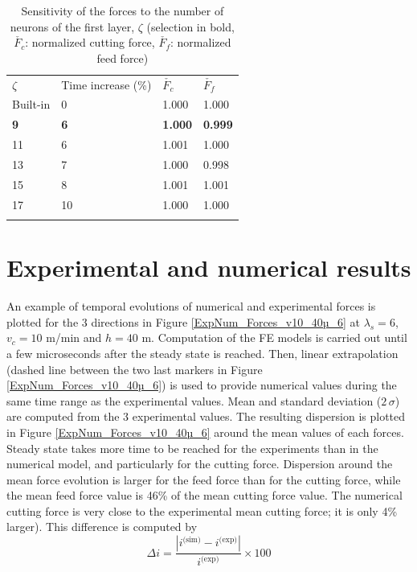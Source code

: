 \documentclass[preprint,12pt,times]{elsarticle}
\begin{document}
%
\begin{table}[!h]
\begin{center}
\caption{\label{tab:NbNeurons} Sensitivity of the forces to the number of neurons of the first layer, $\zeta$
(selection in bold, $\check{F_c}$: normalized cutting force, $\check{F_f}$: normalized feed force)}
\begin{tabular}{llll}
\hline\noalign{\smallskip}
$\zeta$  & Time increase (\%) & $\check{F_c}$ & $\check{F_f}$\\
\noalign{\smallskip}\hline\noalign{\smallskip}
Built-in & 0 & 1.000 & 1.000\\
\textbf{9} & \textbf{6} & \textbf{1.000} & \textbf{0.999}\\
11 & 6 & 1.001 & 1.000\\
13 & 7 & 1.000 & 0.998\\
15 & 8 & 1.001 & 1.001\\
17 & 10 & 1.000 & 1.000\\
\noalign{\smallskip}\hline
\end{tabular}
\end{center}
\end{table}
%

\section{Experimental and numerical results\label{sec:ExpNumResults}}
\label{Results}

An example of temporal evolutions of numerical and experimental forces is plotted for the 3 directions in Figure \ref{ExpNum_Forces_v10_40µ_6} at $\lambda_s = 6$\textdegree{}, $v_c = 10$ m/min and $h = 40$ \textmu{}m. Computation of the FE models is carried out until a few microseconds after the steady state is reached. Then, linear extrapolation (dashed line between the two last markers in Figure \ref{ExpNum_Forces_v10_40µ_6}) is used to provide numerical values during the same time range as the experimental values. Mean and standard deviation ($2\,\sigma$) are computed from the 3 experimental values. The resulting dispersion is plotted in Figure \ref{ExpNum_Forces_v10_40µ_6} around the mean values of each forces. Steady state takes more time to be reached for the experiments than in the numerical model, and particularly for the cutting force. Dispersion around the mean force evolution is larger for the feed force than for the cutting force, while the mean feed force value is 46\% of the mean cutting force value. The numerical cutting force is very close to the experimental mean cutting force; it is only 4\% larger). This difference is computed by
%
\begin{equation}\label{eq:diff}
	\Delta i = \frac{\left|i^\text{(sim)} - i^\text{(exp)}\right|}{i^\text{(exp)}}\times 100
\end{equation}
%
\end{document}
